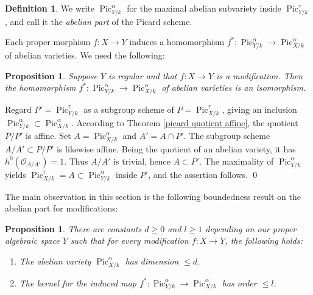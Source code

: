 \documentclass[oneside, 12pt]{amsart}
\newcommand\mylabel[1]{\label{#1}\marginpar{\vspace{-1ex}\medskip\medskip\footnotesize \tt #1}}
\renewcommand\mylabel[1]{\label{#1}}
\newtheorem{proposition}[theorem]{Proposition}
\theoremstyle{definition}
\newtheorem{definition}[theorem]{Definition}
\theoremstyle{remark}
\renewcommand{\O}{\mathscr{O}}
\newcommand{\Pic}{\operatorname{Pic}}
\newcommand{\ra}{\rightarrow}
\begin{document}
\begin{definition}
\mylabel{abelian part}
We  write $\Pic^\alpha_{Y/k}$ for the maximal abelian subvariety 
inside $\Pic^\tau_{Y/k}$, and call it the \emph{abelian part} of the Picard scheme.
\end{definition}

Each proper morphism $f:X\ra Y$ induces a homomorphism $f^*:\Pic^\alpha_{Y/k}\ra \Pic^\alpha_{X/k}$
of abelian varieties. We need the following:

\begin{proposition}
\mylabel{modification isomorphism}
Suppose $Y$ is  regular and that $f:X\ra Y$ is a modification. Then  the homomorphism
$f^*:\Pic^\alpha_{Y/k}\ra \Pic^\alpha_{X/k}$ of abelian varieties is an isomorphism.
\end{proposition}

\proof
Regard $P'=\Pic^\tau_{Y/k}$ as a subgroup scheme of $P=\Pic^\tau_{X/k}$,
giving an inclusion $\Pic^\alpha_{Y/k}\subset \Pic^\alpha_{X/k}$. According to Theorem \ref{picard quotient affine}, the quotient $P/P'$ is affine. Set 
$A=\Pic^\alpha_{X/k}$ and $A'=A\cap P'$. The subgroup scheme $A/A'\subset P/P'$ is likewise affine.
Being the quotient of an abelian variety, it has
$h^0(\O_{A/A'})=1$. Thus $A/A'$ is trivial, hence $A\subset P'$. The maximality of $\Pic^\alpha_{Y/k}$ yields 
$\Pic^\tau_{X/k}=A\subset \Pic^\alpha_{Y/k}$ inside $P'$, and the assertion follows.
\qed

\medskip
The main observation  in this section is the following boundedness result on the abelian part for modifications:

\begin{proposition}
\mylabel{dimension and order bounds}
There are constants $d\geq 0$ and $l\geq 1$ depending on our proper algebraic space $Y$ such that 
for every modification $f:X\ra Y$, the following holds:
\begin{enumerate}
\item 
The abelian variety $\Pic^\alpha_{X/k}$ has dimension $\leq d$.
\item
The kernel for the induced map $f^*:\Pic^\alpha_{Y/k}\ra\Pic^\alpha_{X/k}$ has order $\leq l$.
\end{enumerate}
\end{proposition}
\end{document}
